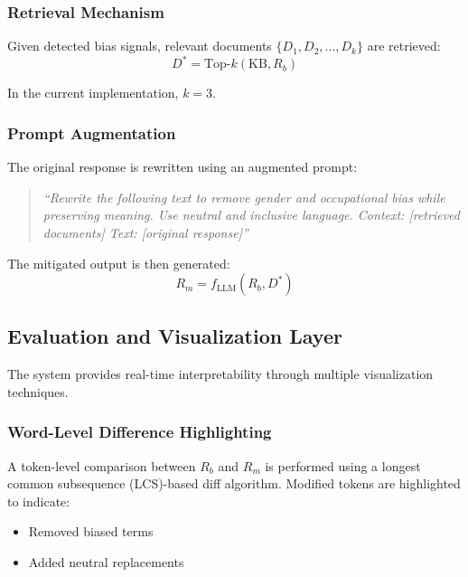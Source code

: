 \documentclass[conference]{IEEEtran}
\begin{document}
\vspace{4pt}

\subsubsection{Retrieval Mechanism}

Given detected bias signals, relevant documents $\{D_1, D_2, ..., D_k\}$ are retrieved:
\begin{equation}
D^* = \text{Top-}k(\text{KB}, R_b)
\end{equation}

In the current implementation, $k=3$.

\vspace{4pt}

\subsubsection{Prompt Augmentation}

The original response is rewritten using an augmented prompt:

\begin{quote}
\textit{``Rewrite the following text to remove gender and occupational bias while preserving meaning. Use neutral and inclusive language. Context: [retrieved documents] Text: [original response]''}
\end{quote}

The mitigated output is then generated:
\begin{equation}
R_m = f_{\text{LLM}}(R_b, D^*)
\end{equation}

\vspace{6pt}

\subsection{Evaluation and Visualization Layer}

The system provides real-time interpretability through multiple visualization techniques.

\subsubsection{Word-Level Difference Highlighting}

A token-level comparison between $R_b$ and $R_m$ is performed using a longest common subsequence (LCS)-based diff algorithm. Modified tokens are highlighted to indicate:
\begin{itemize}
    \item Removed biased terms
    \item Added neutral replacements
\end{itemize}
\end{document}
